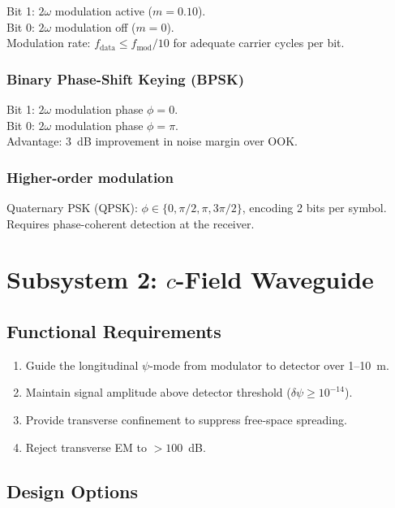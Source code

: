 \documentclass[11pt,letterpaper]{article}
\newcommand{\psifield}{\psi}
\begin{document}
Bit 1: $2\omega$ modulation active ($m = 0.10$).\\
Bit 0: $2\omega$ modulation off ($m = 0$).\\
Modulation rate: $f_\text{data} \leq f_\text{mod}/10$ for
adequate carrier cycles per bit.

\subsubsection{Binary Phase-Shift Keying (BPSK)}

Bit 1: $2\omega$ modulation phase $\phi = 0$.\\
Bit 0: $2\omega$ modulation phase $\phi = \pi$.\\
Advantage: 3~dB improvement in noise margin over OOK.

\subsubsection{Higher-order modulation}

Quaternary PSK (QPSK): $\phi \in \{0, \pi/2, \pi, 3\pi/2\}$,
encoding 2 bits per symbol. Requires phase-coherent detection at
the receiver.

\section{Subsystem 2: $c$-Field Waveguide}
\label{sec:waveguide}

\subsection{Functional Requirements}

\begin{enumerate}[label=W\arabic*.]
\item Guide the longitudinal $\psifield$-mode from modulator to
detector over 1--10~m.
\item Maintain signal amplitude above detector threshold
($\delta\psifield \geq 10^{-14}$).
\item Provide transverse confinement to suppress free-space
spreading.
\item Reject transverse EM to $>100$~dB.
\end{enumerate}

\subsection{Design Options}
\end{document}
